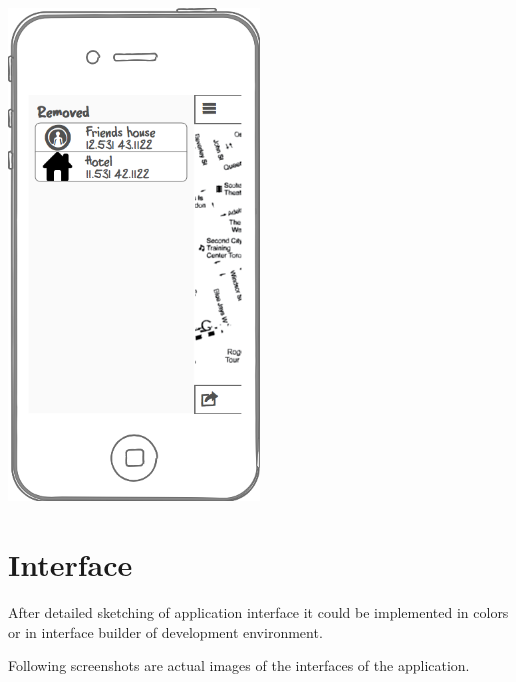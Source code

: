 \documentclass[thesis=M,english]{FITthesis}[2012/10/20]
\begin{document}
\begin{center}
\includegraphics[width=0.5\textwidth]{images/wireframes/removed_places}

\end{center}

\section{Interface}

After detailed sketching of application interface it could be implemented in colors or in interface builder of development environment.

Following screenshots are actual images of the interfaces of the application.

\clearpage
\end{document}

